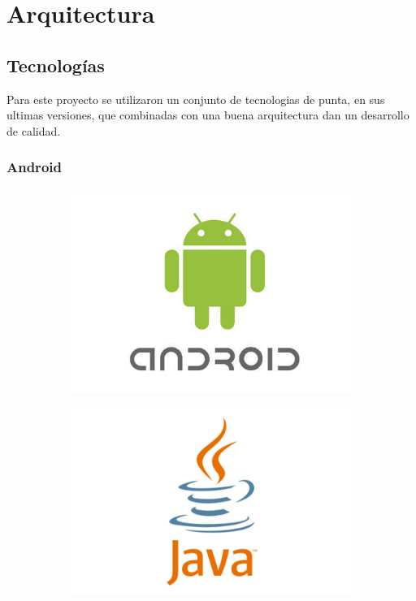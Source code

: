 \section{Arquitectura}
\subsection{Tecnologías}
Para este proyecto se utilizaron un conjunto de tecnologias de punta, en sus ultimas versiones, que combinadas con una buena arquitectura dan un desarrollo de calidad.
\subsubsection{ Android}

\begin{figure}[h!]
\centering
\begin{subfigure}{.2\textwidth}
  \includegraphics[width=\linewidth]{Desarrollo/Arquitectura/imgs/android-logo.jpg}
\end{subfigure}%
\begin{subfigure}{.2\textwidth}
  \includegraphics[width=\linewidth]{Desarrollo/Arquitectura/imgs/java.jpg}
\end{subfigure}
\end{figure}

